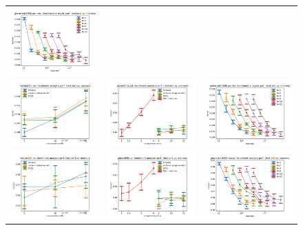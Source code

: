 \begin{figure}
\begin{tabular} {c c c}
	\includegraphics[width=0.28\linewidth]{figures/glove-wiki400k-am_trec_test-err_vs_compression.pdf} \\[-0.5em]
	\includegraphics[width=0.28\linewidth]{figures/fasttext1m_sst_test-err_vs_compression.pdf} &
	\includegraphics[width=0.28\linewidth]{figures/glove400k_sst_test-err_vs_compression.pdf} &
	\includegraphics[width=0.28\linewidth]{figures/glove-wiki400k-am_sst_test-err_vs_compression.pdf} \\[-0.5em]
	\includegraphics[width=0.28\linewidth]{figures/fasttext1m_cr_test-err_vs_compression.pdf} &
	\includegraphics[width=0.28\linewidth]{figures/glove400k_cr_test-err_vs_compression.pdf} &
	\includegraphics[width=0.28\linewidth]{figures/glove-wiki400k-am_cr_test-err_vs_compression.pdf} \\[-0.5em]

\end{tabular}
\end{figure}
